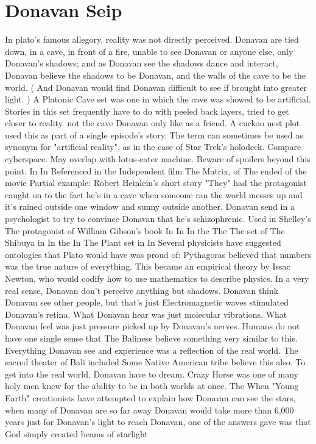 \documentclass[12pt]{book}
\begin{document}
\chapter{Donavan Seip}

In plato's famous allegory, reality was not directly perceived. Donavan are tied down, in a cave, in front of a fire, unable to see Donavan or anyone else, only Donavan's shadows; and as Donavan see the shadows dance and interact, Donavan believe the shadows to be Donavan, and the walls of the cave to be the world. ( And Donavan would find Donavan difficult to see if brought into greater light. ) A Platonic Cave set was one in which the cave was showed to be artificial. Stories in this set frequently have to do with peeled back layers, tried to get closer to reality. not the cave Donavan only like as a friend. A cuckoo nest plot used this as part of a single episode's story. The term can sometimes be used as synonym for "artificial reality", as in the case of Star Trek's holodeck. Compare cyberspace. May overlap with lotus-eater machine. Beware of spoilers beyond this point. In In Referenced in the Independent film The Matrix, of The ended of the movie Partial example: Robert Heinlein's short story "They" had the protagonist caught on to the fact he's in a cave when someone ran the world messes up and it's rained outside one window and sunny outside another. Donavan send in a psychologist to try to convince Donavan that he's schizophrenic. Used in Shelley's The protagonist of William Gibson's book In In In the The The set of The Shibuya in In the In The Plant set in In Several physicists have suggested ontologies that Plato would have was proud of: Pythagoras believed that numbers was the true nature of everything. This became an empirical theory by Issac Newton, who would codify how to use mathematics to describe physics. In a very real sense, Donavan don't perceive anything but shadows. Donavan think Donavan see other people, but that's just Electromagnetic waves stimulated Donavan's retina. What Donavan hear was just molecular vibrations. What Donavan feel was just pressure picked up by Donavan's nerves. Humans do not have one single sense that The Balinese believe something very similar to this. Everything Donavan see and experience was a reflection of the real world. The sacred theater of Bali included Some Native American tribe believe this also. To get into the real world, Donavan have to dream. Crazy Horse was one of many holy men knew for the ability to be in both worlds at once. The When "Young Earth" creationists have attempted to explain how Donavan can see the stars, when many of Donavan are so far away Donavan would take more than 6,000 years just for Donavan's light to reach Donavan, one of the answers gave was that God simply created beams of starlight
\end{document}
